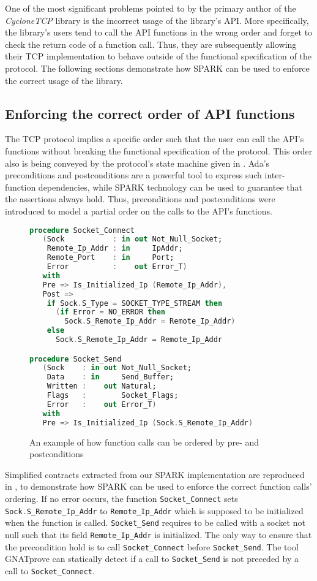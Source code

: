 \documentclass[conference]{IEEEtran}
\def\spark#1{\lstinline[language=Ada]{#1}}
\begin{document}
One of the most significant problems pointed to by the primary author of the \emph{CycloneTCP} library is the incorrect usage of the library's API. More specifically, the library's users tend to call the API functions in the wrong order and forget to check the return code of a function call. Thus, they are subsequently allowing their  TCP implementation to behave outside of the functional specification of the protocol. The following sections demonstrate how SPARK can be used to enforce the correct usage of the library.

\subsection{Enforcing the correct order of API functions}

The TCP protocol implies a specific order such that the user can call the API's functions without breaking the functional specification of the protocol. This order also is being conveyed by the protocol's state machine given in . Ada's preconditions and postconditions are a powerful tool to express such inter-function dependencies, while SPARK technology can be used to guarantee that the assertions always hold. Thus, preconditions and postconditions were introduced to model a partial order on the calls to the API's functions.

\begin{figure}
\begin{lstlisting}[language=Ada,basicstyle=\footnotesize\ttfamily]
procedure Socket_Connect
   (Sock           : in out Not_Null_Socket;
    Remote_Ip_Addr : in     IpAddr;
    Remote_Port    : in     Port;
    Error          :    out Error_T)
   with
   Pre => Is_Initialized_Ip (Remote_Ip_Addr),
   Post =>
    if Sock.S_Type = SOCKET_TYPE_STREAM then
      (if Error = NO_ERROR then
        Sock.S_Remote_Ip_Addr = Remote_Ip_Addr)
    else
      Sock.S_Remote_Ip_Addr = Remote_Ip_Addr

procedure Socket_Send
   (Sock    : in out Not_Null_Socket;
    Data    : in     Send_Buffer;
    Written :    out Natural;
    Flags   :        Socket_Flags;
    Error   :    out Error_T)
   with
   Pre => Is_Initialized_Ip (Sock.S_Remote_Ip_Addr)
\end{lstlisting}
\caption{An example of how function calls can be ordered by pre- and
postconditions}
\label{fig:functionorder}
\end{figure}

Simplified contracts extracted from our SPARK implementation are reproduced in , to demonstrate how SPARK can be used to enforce the correct function calls' ordering. If no error occurs, the function \spark{Socket_Connect} sets \spark{Sock.S_Remote_Ip_Addr} to \spark{Remote_Ip_Addr} which is supposed to be initialized when the function is called. \spark{Socket_Send} requires to be called with a socket not null such that its field \spark{Remote_Ip_Addr} is initialized. The only way to ensure that the precondition hold is to call \spark{Socket_Connect} before \spark{Socket_Send}. The tool GNATprove can statically detect if a call to \spark{Socket_Send} is not preceded by a call to \spark{Socket_Connect}.
\end{document}
